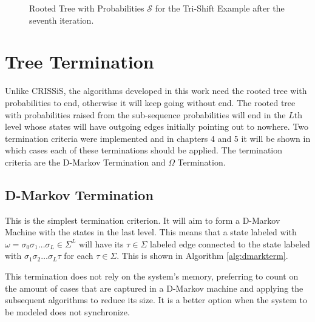{\begin{figure}[h]
\caption{Rooted Tree with Probabilities $\mathcal{S}$ for the Tri-Shift Example after the seventh iteration. \label{fig:trishifttree7}}
\end{figure}


\section{Tree Termination\label{sec:treeterm}}

Unlike CRISSiS, the algorithms developed in this work need the rooted tree with probabilities to end, otherwise it will keep going without end. The rooted tree with probabilities raised from the sub-sequence probabilities will end in the $L$th level whose states will have outgoing edges initially pointing out to nowhere. Two termination criteria were implemented and in chapters 4 and 5 it will be shown in which cases each of these terminations should be applied. The termination criteria are the D-Markov Termination and $\Omega$ Termination.

\subsection{D-Markov Termination}

This is the simplest termination criterion. It will aim to form a D-Markov Machine with the states in the last level. This means that a state labeled with $\omega = \sigma_0\sigma_1\ldots\sigma_L \in \Sigma^L$ will have its $\tau \in \Sigma$ labeled edge connected to the state labeled with $\sigma_1\sigma_2\ldots\sigma_L\tau$ for each $\tau \in \Sigma$. This is shown in Algorithm \ref{alg:dmarkterm}.

This termination does not rely on the system's memory, preferring to count on the amount of cases that are captured in a D-Markov machine and applying the subsequent algorithms to reduce its size. It is a better option when the system to be modeled does not synchronize. 

}
